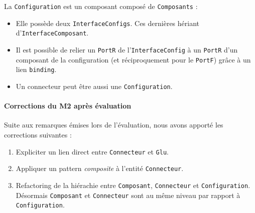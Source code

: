 La \verb+Configuration+  est un composant composé de \verb+Composants+ : 

\begin{itemize}
\item 
  Elle possède deux \verb+InterfaceConfigs+. Ces dernières hériant d'\verb+InterfaceComposant+.
\item
  Il est possible de relier un \verb+PortR+ de l'\verb+InterfaceConfig+ à un \verb+PortR+ d'un composant de la configuration (et réciproquement pour le \verb+PortF+) grâce à un lien \verb+binding+.
\item
  Un connecteur peut être aussi une \verb+Configuration+.
\end{itemize}

\paragraph{Corrections du M2 après évaluation}
Suite aux remarques émises lors de l'évaluation, nous avons apporté les corrections suivantes : 
\begin{enumerate}
\item
  Expliciter un lien direct entre \verb+Connecteur+ et \verb+Glu+.
\item
  Appliquer un pattern \textit{composite} à l'entité \verb+Connecteur+.
\item
  Refactoring de la hiérachie entre \verb+Composant+, \verb+Connecteur+ et \verb+Configuration+. Désormais \verb+Composant+ et \verb+Connecteur+ sont au \og même niveau \fg{} par rapport à \verb+Configuration+.
\end{enumerate}

